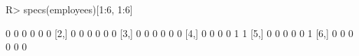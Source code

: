 \begin{Schunk}
% --begin: "lcut.specs"
\begin{Sinput}
R> specs(employees)[1:6, 1:6]
\end{Sinput}
\begin{Soutput}
     [,1] [,2] [,3] [,4] [,5] [,6]
[1,]    0    0    0    0    0    0
[2,]    0    0    0    0    0    0
[3,]    0    0    0    0    0    0
[4,]    0    0    0    0    1    1
[5,]    0    0    0    0    0    1
[6,]    0    0    0    0    0    0
\end{Soutput}
%
% --end: "lcut.specs"
\end{Schunk}
